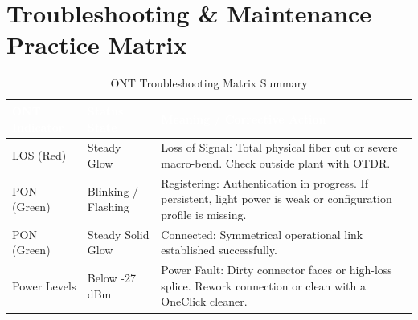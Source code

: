 \documentclass[11pt,a4paper]{report}
\begin{document}
\chapter{Troubleshooting \& Maintenance Practice Matrix}
\begin{table}[H]
\centering
\begin{tabularx}{\textwidth}{l l X}
\rowcolor{primaryColor}
\textcolor{white}{\textbf{ONT Indicator}} & \textcolor{white}{\textbf{Status State}} & \textcolor{white}{\textbf{Meaning / Corrective Action}} \\
\midrule
LOS (Red) & Steady Glow & Loss of Signal: Total physical fiber cut or severe macro-bend. Check outside plant with OTDR. \\
PON (Green) & Blinking / Flashing & Registering: Authentication in progress. If persistent, light power is weak or configuration profile is missing. \\
PON (Green) & Steady Solid Glow & Connected: Symmetrical operational link established successfully. \\
Power Levels & Below -27 dBm & Power Fault: Dirty connector faces or high-loss splice. Rework connection or clean with a OneClick cleaner. \\
\bottomrule
\end{tabularx}
\caption{ONT Troubleshooting Matrix Summary}
\end{table}
\end{document}
